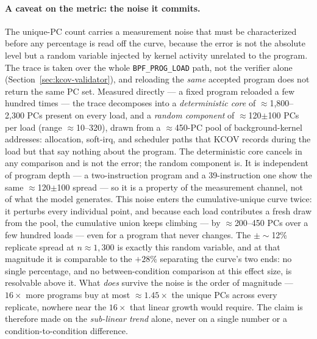 \paragraph{A caveat on the metric: the noise it commits.}
The unique-PC count carries a measurement noise that must be characterized before
any percentage is read off the curve, because the error is not the absolute level
but a random variable injected by kernel activity unrelated to the program. The
trace is taken over the whole \texttt{BPF\_PROG\_LOAD} path, not the verifier alone
(Section~\ref{sec:kcov-validator}), and reloading the \emph{same} accepted program
does not return the same PC set. Measured directly --- a fixed program reloaded a
few hundred times --- the trace decomposes into a \emph{deterministic core} of
$\approx$1{,}800--2{,}300 PCs present on every load, and a \emph{random component}
of $\approx$120$\pm$100 PCs per load (range $\approx$10--320), drawn from a
$\approx$450-PC pool of background-kernel addresses: allocation, soft-irq, and
scheduler paths that KCOV records during the load but that say nothing about the
program. The deterministic core cancels in any comparison and is not the error;
the random component is. It is independent of program depth --- a two-instruction
program and a 39-instruction one show the same $\approx$120$\pm$100 spread --- so it
is a property of the measurement channel, not of what the model generates. This
noise enters the cumulative-unique curve twice: it perturbs every individual point,
and because each load contributes a fresh draw from the pool, the cumulative union
keeps climbing --- by $\approx$200--450 PCs over a few hundred loads --- even for a
program that never changes. The $\pm\sim$12\% replicate spread at $n\approx1{,}300$
is exactly this random variable, and at that magnitude it is comparable to the
$+28\%$ separating the curve's two ends: no single percentage, and no
between-condition comparison at this effect size, is resolvable above it. What
\emph{does} survive the noise is the order of magnitude --- $16\times$ more programs
buy at most $\approx1.45\times$ the unique PCs across every replicate, nowhere near
the $16\times$ that linear growth would require. The claim is therefore made on the
\emph{sub-linear trend} alone, never on a single number or a condition-to-condition
difference.

